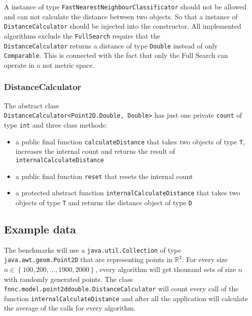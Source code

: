 \documentclass[runningheads,a4paper]{llncs}
\begin{document}
A instance of type \verb+FastNearestNeighbourClassificator+ should not be allowed and can not calculate the distance
between two objects. So that a instance of \verb+DistanceCalculator+ should be injected into the constructor. All
implemented algorithms exclude the \verb+FullSearch+ require that the\\ \verb+DistanceCalculator+ returns a distance of
type \verb+Double+ instead of only\\ \verb+Comparable+. This is connected with the fact that only the Full Search can
operate in a not metric space.

\subsubsection{DistanceCalculator}

The abstract class\\ \verb+DistanceCalculator<Point2D.Double, Double>+ has just one private \verb+count+ of type
\verb+int+ and three class methods:
\begin{itemize}
	\item a public final function \verb+calculateDistance+ that takes two objects of type \verb+T+, increases the
		internal count and returns the result of\\ \verb+internalCalculateDistance+
	\item a public final function \verb+reset+ that resets the internal count
	\item a protected abstract function \verb+internalCalculateDistance+ that takes two objects of type \verb+T+ and
		returns the distance object of type \verb+D+
\end{itemize}

\subsection{Example data}

The benchmarks will use a \verb+java.util.Collection+ of type\\ \verb+java.awt.geom.Point2D+ that are representing
points in $\mathbb{R}^2$. For every size $n \in \left\{ {100, 200, \dots, 1900, 2000}\right\}$, every algorithm will get
thousand sets of size $n$ with randomly generated points. The class\\ \verb+fnnc.model.point2ddouble.DistanceCalculator+
will count every call of the function \verb+internalCalculateDistance+ and after all the application will calculate the
average of the calls for every algorithm.
\end{document}
